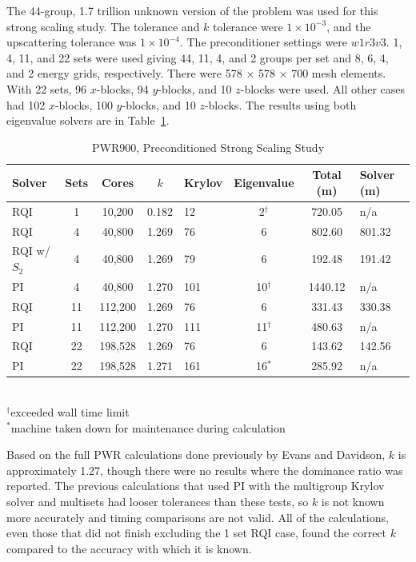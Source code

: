 The 44-group, 1.7 trillion unknown version of the problem was used for this strong scaling study. The tolerance and $k$ tolerance were $1 \times 10^{-3}$, and the upscattering tolerance was $1 \times 10^{-4}$. The preconditioner settings were $w1r3v3$. 1, 4, 11, and 22 sets were used giving 44, 11, 4, and 2 groups per set and 8, 6, 4, and 2 energy grids, respectively. There were 578 $\times$ 578 $\times$ 700 mesh elements. With 22 sets, 96 $x$-blocks, 94 $y$-blocks, and 10 $z$-blocks were used. All other cases had 102 $x$-blocks, 100 $y$-blocks, and 10 $z$-blocks. The results using both eigenvalue solvers are in Table~\ref{table:full PWR}. 
%
\begin{table}[!h]
\caption{PWR900, Preconditioned Strong Scaling Study}
\begin{center}
\begin{tabular}{| l | c | c | c | l | c | c | l |}
\hline
Solver & Sets & Cores & $k$ & Krylov & Eigenvalue & Total (m) & Solver (m)\\[0.5ex]
\hline
RQI & 1   & 10,200   & 0.182 & 12    & 2$^{\dag}$ & 720.05    & n/a \\
RQI & 4   & 40,800   & 1.269 & 76   &  6               & 802.60   & 801.32 \\
RQI w/ $S_{2}$ & 4   & 40,800   & 1.269 & 79   &  6               & 192.48   & 191.42 \\
PI    & 4   & 40,800   & 1.270 & 101 & 10$^{\dag}$ & 1440.12 & n/a \\
RQI & 11 & 112,200 & 1.269 & 76   & 6                & 331.43    & 330.38 \\
PI    & 11 & 112,200 & 1.270 & 111 & 11$^{\dag}$ & 480.63    & n/a \\
RQI & 22 & 198,528 & 1.269 & 76   & 6                & 143.62    & 142.56 \\
PI    & 22 & 198,528 & 1.271 & 161 & 16$^{*}$      & 285.92    & n/a \\
\hline 
\end{tabular}\\
$^{\dag}$exceeded wall time limit \\ 
$^{*}$machine taken down for maintenance during calculation
\end{center}
\label{table:full PWR}
\end{table}  

Based on the full PWR calculations done previously by Evans and Davidson, $k$ is approximately 1.27, though there were no results where the dominance ratio was reported. The previous calculations that used PI with the multigroup Krylov solver and multisets had looser tolerances than these tests, so $k$ is not known more accurately and timing comparisons are not valid. All of the calculations, even those that did not finish excluding the 1 set RQI case, found the correct $k$ compared to the accuracy with which it is known. 

